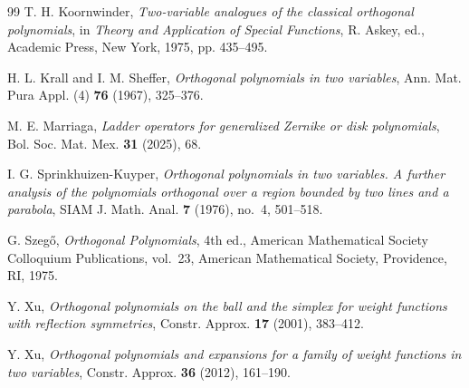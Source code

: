 \documentclass[reqno,10pt]{amsart}
\theoremstyle{plain}
\numberwithin{equation}{section}
\numberwithin{figure}{section}
\begin{document}
\begin{thebibliography}{99}
T. H. Koornwinder,
\textit{Two-variable analogues of the classical orthogonal polynomials},
in \textit{Theory and Application of Special Functions},
R. Askey, ed., Academic Press, New York, 1975, pp. 435--495.

H. L. Krall and I. M. Sheffer,
\textit{Orthogonal polynomials in two variables},
Ann. Mat. Pura Appl. (4) \textbf{76} (1967), 325--376.




M. E. Marriaga,
\textit{Ladder operators for generalized Zernike or disk polynomials},
Bol. Soc. Mat. Mex. \textbf{31} (2025), 68.

I. G. Sprinkhuizen-Kuyper,
\textit{Orthogonal polynomials in two variables. A further analysis of the
polynomials orthogonal over a region bounded by two lines and a parabola},
SIAM J. Math. Anal. \textbf{7} (1976), no.~4, 501--518.

G. Szeg\H{o},
\textit{Orthogonal Polynomials},
4th ed., American Mathematical Society Colloquium Publications, vol.~23,
American Mathematical Society, Providence, RI, 1975.

Y. Xu,
\textit{Orthogonal polynomials on the ball and the simplex for weight functions with reflection symmetries},
Constr. Approx. \textbf{17} (2001), 383--412.

Y. Xu,
\textit{Orthogonal polynomials and expansions for a family of weight functions
in two variables},
Constr. Approx. \textbf{36} (2012), 161--190.

\end{thebibliography}
\end{document}
